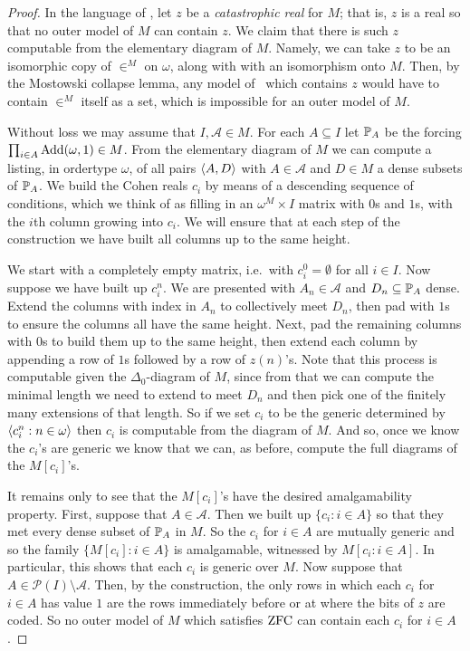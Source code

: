 \documentclass{amsart}
\begin{document}
\begin{proof}
In the language of \cite{HHKVW2019}, let $z$ be a \emph{catastrophic real} for $M$; that is, $z$ is a real so that no outer model of $M$ can contain $z$. We claim that there is such $z$ computable from the elementary diagram of $M$. Namely, we can take $z$ to be an isomorphic copy of $\in^M$ on $\omega$, along with with an isomorphism onto $M$. Then, by the Mostowski collapse lemma, any model of \ZF\ which contains $z$ would have to contain $\in^M$ itself as a set, which is impossible for an outer model of $M$.

Without loss we may assume that $I,\mathcal A \in M$. For each $A \subseteq I$ let $\P_A$ be the forcing $\prod_{i \in A} \Add(\omega,1) \in M$.
From the elementary diagram of $M$ we can compute a listing, in ordertype $\omega$, of all pairs $\<A,D>$ with $A \in \mathcal A$ and $D \in M$ a dense subsets of $\P_A$. We build the Cohen reals $c_i$ by means of a descending sequence of conditions, which we think of as filling in an $\omega^M \times I$ matrix with $0$s and $1$s, with the $i$th column growing into $c_i$. We will ensure that at each step of the construction we have built all columns up to the same height.

We start with a completely empty matrix, i.e.\ with $c^0_i = \emptyset$ for all $i \in I$. Now suppose we have built up $c^n_i$. We are presented with $A_n \in \mathcal A$ and $D_n \subseteq \P_A$ dense. Extend the columns with index in $A_n$ to collectively meet $D_n$, then pad with $1$s to ensure the columns all have the same height. Next, pad the remaining columns with $0$s to build them up to the same height, then extend each column by appending a row of $1$s followed by a row of $z(n)$'s. Note that this process is computable given the $\Delta_0$-diagram of $M$, since from that we can compute the minimal length we need to extend to meet $D_n$ and then pick one of the finitely many extensions of that length. So if we set $c_i$ to be the generic determined by $\<c^n_i : n \in \omega>$ then $c_i$ is computable from the diagram of $M$. And so, once we know the $c_i$'s are generic we know that we can, as before, compute the full diagrams of the $M[c_i]$'s.

It remains only to see that the $M[c_i]$'s have the desired amalgamability property. First, suppose that $A \in \mathcal A$. Then we built up $\{ c_i : i \in A \}$ so that they met every dense subset of $\P_A$ in $M$. So the $c_i$ for $i \in A$ are mutually generic and so the family $\{ M[c_i] : i \in A \}$ is amalgamable, witnessed by $M[c_i : i \in A]$. In particular, this shows that each $c_i$ is generic over $M$. Now suppose that $A \in \mathcal P(I) \setminus \mathcal A$. Then, by the construction, the only rows in which each $c_i$ for $i \in A$ has value $1$ are the rows immediately before or at where the bits of $z$ are coded. So no outer model of $M$ which satisfies $\ZFC$ can contain each $c_i$ for $i \in A$.
\end{proof}
\end{document}
